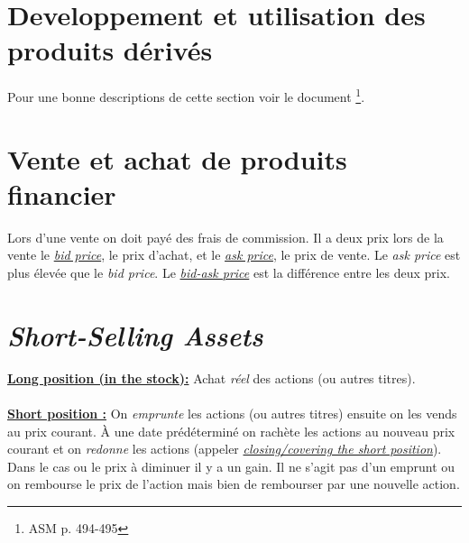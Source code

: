\documentclass[11pt,french]{report}
\begin{document}
\section{Developpement et utilisation des produits dérivés}
\label{sec:developpement et utilisation}

Pour une bonne descriptions de cette section voir le document \footnote{ASM p. 494-495}.

\section{Vente et achat de produits financier}
\label{sec:vente achat}

Lors d'une vente on doit payé des frais de commission. Il a deux prix lors de la vente le \href{http://www.investopedia.com/terms/b/bid-and-asked.asp?o=40186&l=dir&qsrc=999&qo=investopediaSiteSearch}{\emph{bid price}}, le prix d'achat, et le \href{http://www.investopedia.com/terms/b/bid-and-asked.asp?o=40186&l=dir&qsrc=999&qo=investopediaSiteSearch}{\emph{ask price}}, le prix de vente. Le \emph{ask price} est plus élevée que le \emph{bid price}. Le \href{http://www.investopedia.com/terms/b/bid-askspread.asp?o=40186&l=dir&qsrc=999&qo=investopediaSiteSearch}{\emph{bid-ask price}} est la différence entre les deux prix. 

\section{\emph{Short-Selling Assets}}
\label{sec:short-selling assets}

\href{http://www.investopedia.com/terms/l/long.asp?o=40186&l=dir&qsrc=999&qo=investopediaSiteSearch&ap=investopedia.com}{\textbf{Long position (in the stock):}}  Achat \textit{réel} des actions (ou autres titres).
\\
\\ \href{http://www.investopedia.com/terms/s/short.asp?o=40186&l=dir&qsrc=999&qo=investopediaSiteSearch}{\textbf{Short position :}}  On \emph{emprunte} les actions (ou autres titres) ensuite on les vends au prix courant. À une date prédéterminé on rachète les actions au nouveau prix courant et on \textit{redonne} les actions (appeler \href{http://www.investopedia.com/terms/c/closeposition.asp?o=40186&l=dir&qsrc=999&qo=investopediaSiteSearch&ap=investopedia.com}{\emph{closing/covering the short position}}). Dans le cas ou le prix à diminuer il y a un gain. Il ne s'agit pas d'un emprunt ou on rembourse le prix de l'action mais bien de rembourser par une nouvelle action.
\end{document}
